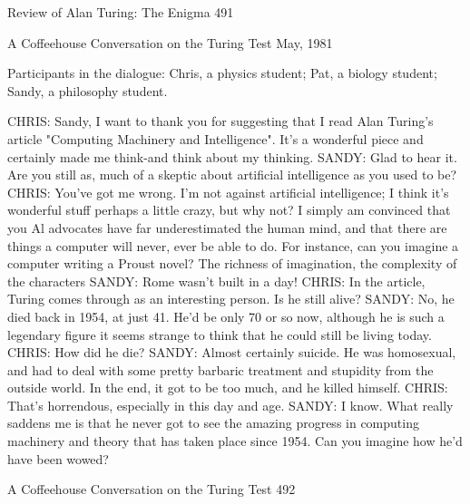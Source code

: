 Review of Alan Turing: The Enigma                                                     491


                    A Coffeehouse Conversation
                        on the Turing Test
                                      May, 1981



                            Participants in the dialogue:
    Chris, a physics student; Pat, a biology student; Sandy, a philosophy student.

CHRIS: Sandy, I want to thank you for suggesting that I read Alan Turing's article
   "Computing Machinery and Intelligence". It's a wonderful piece and certainly
   made me think-and think about my thinking.
SANDY: Glad to hear it. Are you still as, much of a skeptic about artificial
   intelligence as you used to be?
CHRIS: You've got me wrong. I'm not against artificial intelligence; I think it's
   wonderful stuff perhaps a little crazy, but why not? I simply am convinced that
   you Al advocates have far underestimated the human mind, and that there are
   things a computer will never, ever be able to do. For instance, can you imagine a
   computer writing a Proust novel? The richness of imagination, the complexity of
   the characters
SANDY: Rome wasn't built in a day!
CHRIS: In the article, Turing comes through as an interesting person. Is he still alive?
SANDY: No, he died back in 1954, at just 41. He'd be only 70 or so now, although he
   is such a legendary figure it seems strange to think that he could still be living
   today.
CHRIS: How did he die?
SANDY: Almost certainly suicide. He was homosexual, and had to deal with some
   pretty barbaric treatment and stupidity from the outside world. In the end, it got
   to be too much, and he killed himself.
CHRIS: That's horrendous, especially in this day and age.
SANDY: I know. What really saddens me is that he never got to see the amazing
   progress in computing machinery and theory that has taken place since 1954. Can
   you imagine how he'd have been wowed?




A Coffeehouse Conversation on the Turing Test                                        492

